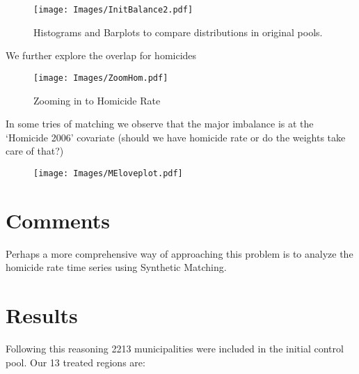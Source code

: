 \documentclass{article}[11 pt]
\begin{document}
\begin{figure}[ht]

    \centering
        \texttt{[image: Images/InitBalance2.pdf]}
\caption{Histograms and Barplots  to compare distributions in original pools.}
\label{initBalance2}
\end{figure}

We further explore the overlap for homicides
\begin{figure}[ht]

    \centering
        \texttt{[image: Images/ZoomHom.pdf]}
\caption{Zooming in to Homicide Rate}
\label{ZoomHom}
\end{figure}

In some tries of matching we observe that the major imbalance is at the `Homicide 2006' covariate (should we have homicide rate or do the weights take care of that?)



\begin{figure}[ht]
    \centering
        \texttt{[image: Images/MEloveplot.pdf]}
\end{figure}

\section{Comments}
Perhaps a more comprehensive way of approaching this problem is to analyze the homicide rate time series using Synthetic Matching.

\section{Results}
Following this reasoning 2213 municipalities were included in the initial control pool. Our 13 treated regions are:
\end{document}
